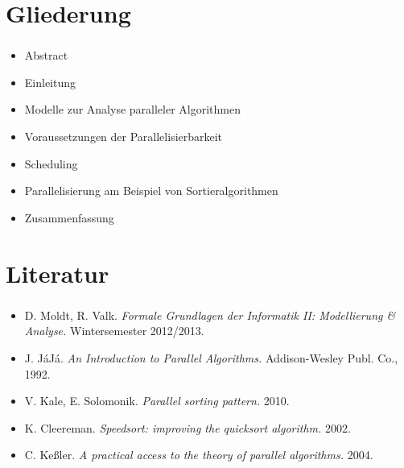 
\section{Gliederung}
\label{sec:gliederung}

\begin{frame}
\frametitle{\insertsection} 
    \begin{itemize}
        \item Abstract
        \item Einleitung
        \item Modelle zur Analyse paralleler Algorithmen
        \item Voraussetzungen der Parallelisierbarkeit
        \item Scheduling
        \item Parallelisierung am Beispiel von Sortieralgorithmen
        \item Zusammenfassung
    \end{itemize}
\end{frame}


\section{Literatur}

\begin{frame}
    \frametitle{\insertsection}
    \begin{itemize}
        \item D. Moldt, R. Valk. \emph{Formale Grundlagen der Informatik II: Modellierung \& Analyse.} Wintersemester 2012/2013.
        \item J. J\'aJ\'a. \emph{An Introduction to Parallel Algorithms.} Addison-Wesley Publ. Co., 1992.
        \item V. Kale, E. Solomonik. \emph{Parallel sorting pattern.} 2010.
        \item K. Cleereman. \emph{Speedsort: improving the quicksort algorithm.} 2002.
        \item C. Keßler. \emph{A practical access to the theory of parallel algorithms.} 2004.
    \end{itemize}
\end{frame}


